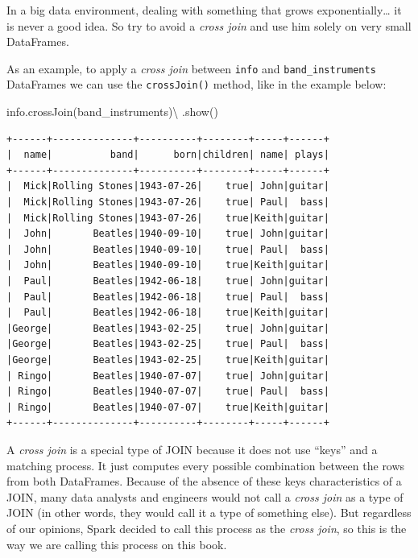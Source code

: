 \documentclass[
  11pt,
  letterpaper,
  DIV=11,
  numbers=noendperiod]{scrreprt}
\newenvironment{Shaded}{\begin{snugshade}}{\end{snugshade}}
\newcommand{\NormalTok}[1]{\textcolor[rgb]{0.00,0.23,0.31}{#1}}
\newcommand{\OperatorTok}[1]{\textcolor[rgb]{0.37,0.37,0.37}{#1}}
\begin{document}
In a big data environment, dealing with something that grows
exponentially\ldots{} it is never a good idea. So try to avoid a
\emph{cross join} and use him solely on very small DataFrames.

As an example, to apply a \emph{cross join} between \texttt{info} and
\texttt{band\_instruments} DataFrames we can use the
\texttt{crossJoin()} method, like in the example below:

\begin{Shaded}
\begin{Highlighting}[]
\NormalTok{info.crossJoin(band\_instruments)}\OperatorTok{\textbackslash{}}
\NormalTok{    .show()}
\end{Highlighting}
\end{Shaded}







\begin{verbatim}
+------+--------------+----------+--------+-----+------+
|  name|          band|      born|children| name| plays|
+------+--------------+----------+--------+-----+------+
|  Mick|Rolling Stones|1943-07-26|    true| John|guitar|
|  Mick|Rolling Stones|1943-07-26|    true| Paul|  bass|
|  Mick|Rolling Stones|1943-07-26|    true|Keith|guitar|
|  John|       Beatles|1940-09-10|    true| John|guitar|
|  John|       Beatles|1940-09-10|    true| Paul|  bass|
|  John|       Beatles|1940-09-10|    true|Keith|guitar|
|  Paul|       Beatles|1942-06-18|    true| John|guitar|
|  Paul|       Beatles|1942-06-18|    true| Paul|  bass|
|  Paul|       Beatles|1942-06-18|    true|Keith|guitar|
|George|       Beatles|1943-02-25|    true| John|guitar|
|George|       Beatles|1943-02-25|    true| Paul|  bass|
|George|       Beatles|1943-02-25|    true|Keith|guitar|
| Ringo|       Beatles|1940-07-07|    true| John|guitar|
| Ringo|       Beatles|1940-07-07|    true| Paul|  bass|
| Ringo|       Beatles|1940-07-07|    true|Keith|guitar|
+------+--------------+----------+--------+-----+------+
\end{verbatim}

A \emph{cross join} is a special type of JOIN because it does not use
``keys'' and a matching process. It just computes every possible
combination between the rows from both DataFrames. Because of the
absence of these keys characteristics of a JOIN, many data analysts and
engineers would not call a \emph{cross join} as a type of JOIN (in other
words, they would call it a type of something else). But regardless of
our opinions, Spark decided to call this process as the \emph{cross
join}, so this is the way we are calling this process on this book.
\end{document}
